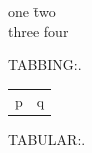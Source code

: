 \documentclass{article}
\let\primhalign\halign
\begin{document}
\begingroup
\def\halign{\global\advance\hcount1\relax\primhalign}
\begin{tabbing}
one \= two \\
three \> four
\end{tabbing}
TABBING:\the\hcount.

\def\halign{\global\advance\hcount1\relax XYZ\primhalign}
\begin{tabular}{ll} p & q \end{tabular} TABULAR:\the\hcount.
\endgroup
\end{document}
